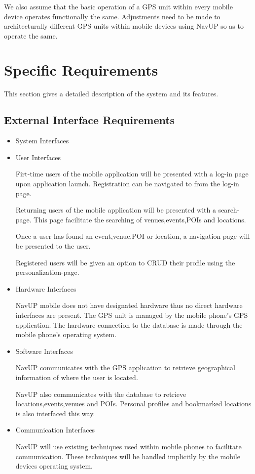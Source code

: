 \documentclass{article}
\begin{document}
        \begin{flushleft}
        We also assume that the basic operation of a GPS unit within every mobile device operates functionally the same. Adjustments need to be made to architecturally different GPS units within mobile devices using NavUP so as to operate the same.
        \end{flushleft}
\section{Specific Requirements}
    \begin{flushleft}
    This section gives a detailed description of the system and its features.
    \end{flushleft}
    \subsection{External Interface Requirements}
		\begin{itemize}
		
			\item System Interfaces
			\item User Interfaces
			
			Firt-time users of the mobile application will be presented with a log-in page upon application launch. Registration can be navigated to from the log-in page.
			
			Returning users of the mobile application will be presented with a search-page. This page facilitate the searching of venues,events,POIs and locations.
			
			Once a user has found an event,venue,POI or location, a navigation-page will be presented to the user.
			
			Registered users will be given an option to CRUD their profile using the personalization-page.
			
			
			\item Hardware Interfaces
			
			NavUP mobile does not have designated hardware thus no direct hardware interfaces are present. The GPS unit is managed by the mobile phone's GPS application. The hardware connection to the database is made through the mobile phone's operating system.
			
			\item Software Interfaces
			
			NavUP communicates with the GPS application to retrieve geographical information of where the user is located.
			
			NavUP also communicates with the database to retrieve locations,events,venues and POIs. Personal profiles and bookmarked locations is also interfaced this way.
			
			
			\item Communication Interfaces
			
			NavUP will use existing techniques used within mobile phones to facilitate communication. These techniques will he handled implicitly by the mobile devices operating system.
			
		\end{itemize}
\end{document}
